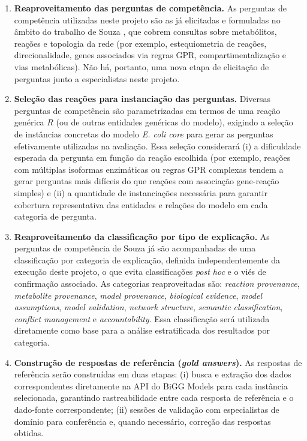 \documentclass{article}
\begin{document}
	\begin{enumerate}
		\item \textbf{Reaproveitamento das perguntas de competência.} As perguntas de competência utilizadas neste projeto são as já elicitadas e formuladas no âmbito do trabalho de Souza \cite{souza2025ontogem}, que cobrem consultas sobre metabólitos, reações e topologia da rede (por exemplo, estequiometria de reações, direcionalidade, genes associados via regras GPR, compartimentalização e vias metabólicas). Não há, portanto, uma nova etapa de elicitação de perguntas junto a especialistas neste projeto.
		\item \textbf{Seleção das reações para instanciação das perguntas.} Diversas perguntas de competência são parametrizadas em termos de uma reação genérica $R$ (ou de outras entidades genéricas do modelo), exigindo a seleção de instâncias concretas do modelo \textit{E. coli core} para gerar as perguntas efetivamente utilizadas na avaliação. Essa seleção considerará (i) a dificuldade esperada da pergunta em função da reação escolhida (por exemplo, reações com múltiplas isoformas enzimáticas ou regras GPR complexas tendem a gerar perguntas mais difíceis do que reações com associação gene-reação simples) e (ii) a quantidade de instanciações necessária para garantir cobertura representativa das entidades e relações do modelo em cada categoria de pergunta.
		\item \textbf{Reaproveitamento da classificação por tipo de explicação.} As perguntas de competência de Souza \cite{souza2025ontogem} já são acompanhadas de uma classificação por categoria de explicação, definida independentemente da execução deste projeto, o que evita classificações \textit{post hoc} e o viés de confirmação associado. As categorias reaproveitadas são: \textit{reaction provenance}, \textit{metabolite provenance}, \textit{model provenance}, \textit{biological evidence}, \textit{model assumptions}, \textit{model validation}, \textit{network structure}, \textit{semantic classification}, \textit{conflict management} e \textit{accountability}. Essa classificação será utilizada diretamente como base para a análise estratificada dos resultados por categoria.
		\item \textbf{Construção de respostas de referência (\textit{gold answers}).} As respostas de referência serão construídas em duas etapas: (i) busca e extração dos dados correspondentes diretamente na API do BiGG Models para cada instância selecionada, garantindo rastreabilidade entre cada resposta de referência e o dado-fonte correspondente; (ii) sessões de validação com especialistas de domínio para conferência e, quando necessário, correção das respostas obtidas.

\end{enumerate}
\end{document}
